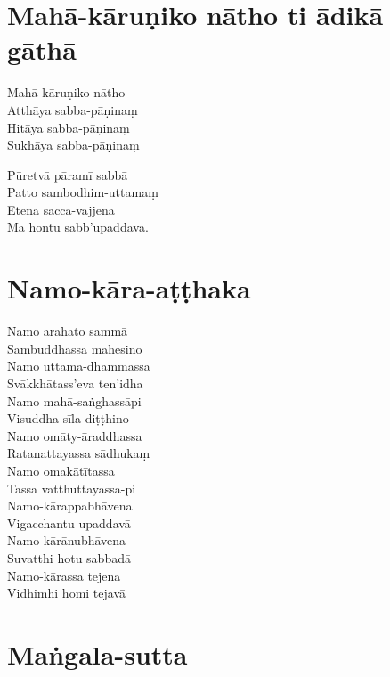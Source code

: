 \section{Mahā-kāruṇiko nātho ti ādikā gāthā}

\begin{paritta}
Mahā-kāruṇiko nātho\\
Atthāya sabba-pāṇinaṃ\\
Hitāya sabba-pāṇinaṃ\\
Sukhāya sabba-pāṇinaṃ

Pūretvā pāramī sabbā\\
Patto sambodhim-uttamaṃ\\
Etena sacca-vajjena\\
Mā hontu sabb'upaddavā.
\end{paritta}

\vspace*{-0.6\baselineskip}

\enlargethispage{3\baselineskip}

\section{Namo-kāra-aṭṭhaka}

\begin{paritta}
Namo arahato sammā\\
Sambuddhassa mahesino\\
Namo uttama-dhammassa\\
Svākkhātass'eva ten'idha\\
Namo mahā-saṅghassāpi\\
Visuddha-sīla-diṭṭhino\\
Namo omāty-āraddhassa\\
Ratanattayassa sādhukaṃ\\
Namo omakātītassa\\
Tassa vatthuttayassa-pi\\
Namo-kārappabhāvena\\
Vigacchantu upaddavā\\
Namo-kārānubhāvena\\
Suvatthi hotu sabbadā\\
Namo-kārassa tejena\\
Vidhimhi homi tejavā\\
\end{paritta}

\section{Maṅgala-sutta}

